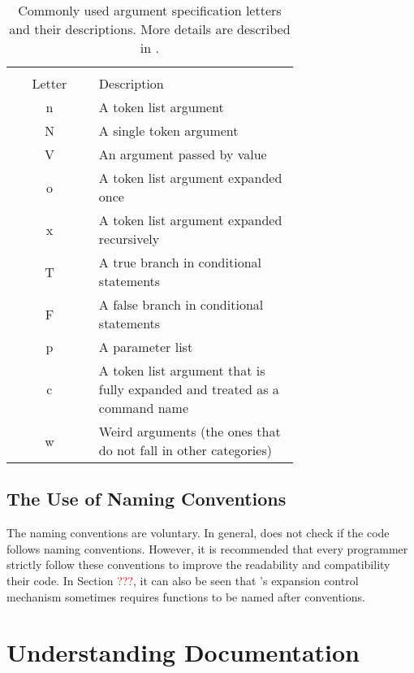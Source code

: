 \documentclass{ltugboat}
\begin{document}
\begin{table}[htpb]
\centering
\small
\setlength\extrarowheight{3pt}
\begin{tabular}{>{\ttfamily\centering}cm{0.7\linewidth}}
\toprule
\multicolumn{1}{c}{\makecell{\texttt{arg-spec}\\ Letter}} & Description\\ \midrule
n & A token list argument\\
N & A single token argument\\
V & An argument passed by value\\
o & A token list argument expanded once\\
x & A token list argument expanded recursively\\
T & A true branch in conditional statements\\
F & A false branch in conditional statements\\
p & A parameter list\\
c & A token list argument that is fully expanded and treated as a command name\\
w & Weird arguments (the ones that do not fall in other categories)\\
\bottomrule
\end{tabular}
\caption{Commonly used argument specification letters and their descriptions. More details are described in .}
\label{tbl:arg-spec-type}
\end{table}


\subsection{The Use of \LTT{} Naming Conventions}

The \LTT{} naming conventions are voluntary. 
In general, \LTT{} does not check if the code follows \LTT{} naming conventions.
However, it is recommended that every \LTT{} programmer strictly follow these conventions to improve the readability and compatibility their code.
In Section \textcolor{red}{???}, it can also be seen that \LTT{}'s expansion control mechanism sometimes requires functions to be named after \LTT{} conventions.


\section{Understanding \LTT{} Documentation}
\end{document}
